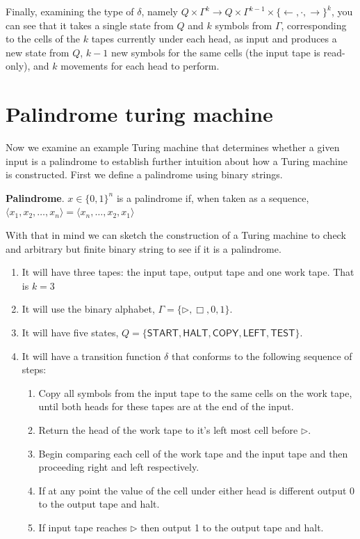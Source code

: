 \documentclass[usletter]{article}
\begin{document}
Finally, examining the type of $\delta$, namely $Q \times \Gamma^{k} \rightarrow Q \times \Gamma^{k-1} \times \{\leftarrow, \cdot, \rightarrow\} ^k$, you can see that it takes a single state from $Q$ and $k$ symbols from $\Gamma$, corresponding to the cells of the $k$ tapes currently under each head, as input and produces a new state from $Q$, $k-1$ new symbols for the same cells (the input tape is read-only), and $k$ movements for each head to perform.

\section{Palindrome turing machine}

Now we examine an example Turing machine that determines whether a given input is a palindrome to establish further intuition about how a Turing machine is constructed. First we define a palindrome using binary strings.

\begin{definition}
  \textbf{Palindrome}. $x \in \{0, 1\}^n$ is a palindrome if, when taken as a sequence, $\langle x_1,x_2,\ldots,x_n \rangle = \langle x_n,\ldots,x_2,x_1\rangle$
\end{definition}

With that in mind we can sketch the construction of a Turing machine to check and arbitrary but finite binary string to see if it is a palindrome.

\begin{enumerate}
  \item It will have three tapes: the input tape, output tape and one work tape. That is $k = 3$
  \item It will use the binary alphabet, $\Gamma = \{\rhd, \Box, 0, 1\}$.
  \item It will have five states, $Q = \{ \textsf{START}, \textsf{HALT}, \textsf{COPY}, \textsf{LEFT}, \textsf{TEST}\} $.
  \item It will have a transition function $\delta$ that conforms to the following sequence of steps:
    \begin{enumerate}
      \item Copy all symbols from the input tape to the same cells on the work tape, until both heads for these tapes are at the end of the input.
      \item Return the head of the work tape to it's left most cell before $\rhd$.
      \item Begin comparing each cell of the work tape and the input tape and then proceeding right and left respectively.
      \item If at any point the value of the cell under either head is different output 0 to the output tape and halt.
      \item If input tape reaches $\rhd$ then output 1 to the output tape and halt.
    \end{enumerate}
\end{enumerate}
\end{document}

